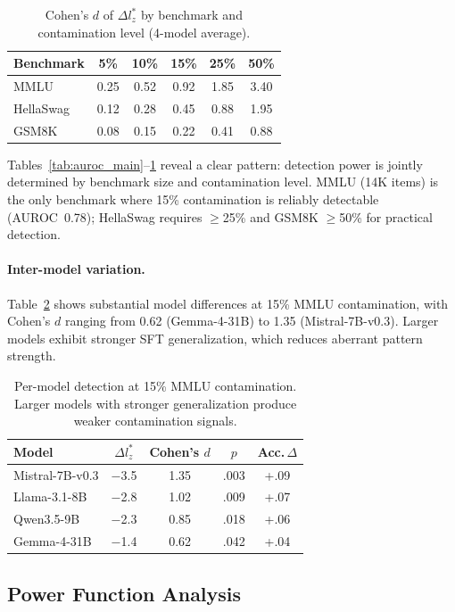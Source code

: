 \documentclass[11pt,a4paper]{article}
\begin{document}
\begin{table}[t]
\centering
\small
\caption{Cohen's $d$ of $\Delta l_z^*$ by benchmark and contamination level (4-model average).}
\label{tab:cohend}
\begin{tabular}{lccccc}
\toprule
Benchmark & 5\% & 10\% & 15\% & 25\% & 50\% \\
\midrule
MMLU & 0.25 & 0.52 & 0.92 & 1.85 & 3.40 \\
HellaSwag & 0.12 & 0.28 & 0.45 & 0.88 & 1.95 \\
GSM8K & 0.08 & 0.15 & 0.22 & 0.41 & 0.88 \\
\bottomrule
\end{tabular}
\end{table}

Tables~\ref{tab:auroc_main}--\ref{tab:cohend} reveal a clear pattern: detection power is jointly determined by benchmark size and contamination level. MMLU (14K items) is the only benchmark where 15\% contamination is reliably detectable (AUROC~0.78); HellaSwag requires $\geq$25\% and GSM8K $\geq$50\% for practical detection.

\paragraph{Inter-model variation.} Table~\ref{tab:per_model} shows substantial model differences at 15\% MMLU contamination, with Cohen's $d$ ranging from 0.62 (Gemma-4-31B) to 1.35 (Mistral-7B-v0.3). Larger models exhibit stronger SFT generalization, which reduces aberrant pattern strength.

\begin{table}[t]
\centering
\small
\caption{Per-model detection at 15\% MMLU contamination. Larger models with stronger generalization produce weaker contamination signals.}
\label{tab:per_model}
\begin{tabular}{lcccc}
\toprule
Model & $\Delta l_z^*$ & Cohen's $d$ & $p$ & Acc.\,$\Delta$ \\
\midrule
Mistral-7B-v0.3 & $-$3.5 & 1.35 & .003 & +.09 \\
Llama-3.1-8B & $-$2.8 & 1.02 & .009 & +.07 \\
Qwen3.5-9B & $-$2.3 & 0.85 & .018 & +.06 \\
Gemma-4-31B & $-$1.4 & 0.62 & .042 & +.04 \\
\bottomrule
\end{tabular}
\end{table}


\subsection{Power Function Analysis}
\label{sec:power}
\end{document}
